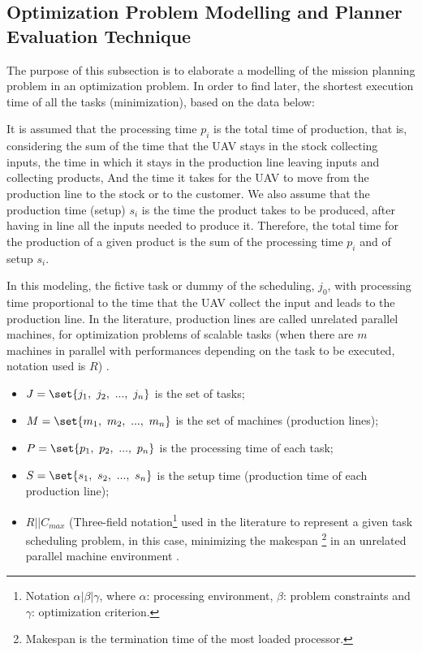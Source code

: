 \documentclass[conference,harvard,brazil,english]{sbatex}
\begin{document}
\subsection{Optimization Problem Modelling and Planner Evaluation Technique}
\label{modelo}

The purpose of this subsection is to elaborate a modelling of the mission planning problem in an optimization problem. In order to find later, the shortest execution time of all the tasks (minimization), based on the data below:

It is assumed that the processing time $ p_i $ is the total time of production, that is, considering the sum of the time that the UAV stays in the stock collecting inputs, the time in which it stays in the production line leaving inputs and collecting products, And the time it takes for the UAV to move from the production line to the stock or to the customer. We also assume that the production time (setup) $s_i$ is the time the product takes to be produced, after having in line all the inputs needed to produce it. Therefore, the total time for the production of a given product is the sum of the processing time $p_i$ and of setup $s_i$.

In this modeling, the fictive task or dummy of the scheduling, $j_0$, with processing time proportional to the time that the UAV collect the input and leads to the production line. In the literature, production lines are called unrelated parallel machines, for optimization problems of scalable tasks (when there are $m$ machines in parallel with performances depending on the task to be executed, notation used is $R$) \cite{du2008scheduling}.


\begin{itemize}
\item $J = \set{j_1,~j_2,~...,~j_n}$ is the set of tasks;
\item $M = \set{m_1,~m_2,~...,~m_n}$ is the set of machines (production lines);
\item $P = \set{p_1,~p_2,~...,~p_n}$ is the processing time of each task;
\item $S = \set{s_1,~s_2,~...,~s_n}$ is the setup time (production time of each production line);
\item $R||C_{max}$ (Three-field notation\footnote{Notation $\alpha | \beta | \gamma$, where $\alpha$: processing environment, $\beta$: problem constraints and $\gamma$: optimization criterion.} used in the literature to represent a given task scheduling problem, in this case, minimizing the makespan \footnote{Makespan is the termination time of the most loaded processor.} in an unrelated parallel machine environment \cite{graham1979optimization}.
\end{itemize}
\end{document}
